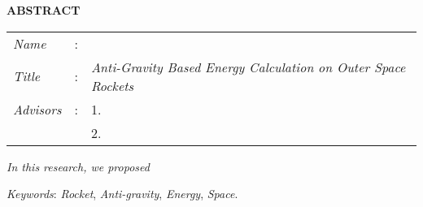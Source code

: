 \begin{center}
  \large\textbf{ABSTRACT}
\end{center}


\vspace{2ex}

\begingroup
\setlength{\tabcolsep}{0pt}

\noindent
\begin{tabularx}{\textwidth}{l >{\centering}m{3em} X}
  \emph{Name}     & : & \name{}                                                             \\

  \emph{Title}    & : & \emph{Anti-Gravity Based Energy Calculation on Outer Space Rockets} \\

  \emph{Advisors} & : & 1. \advisor{}                                                       \\
                  &   & 2. \coadvisor{}                                                     \\
\end{tabularx}
\endgroup

\emph{In this research, we proposed \lipsum[1]}

\emph{Keywords}: \emph{Rocket}, \emph{Anti-gravity}, \emph{Energy}, \emph{Space}.
